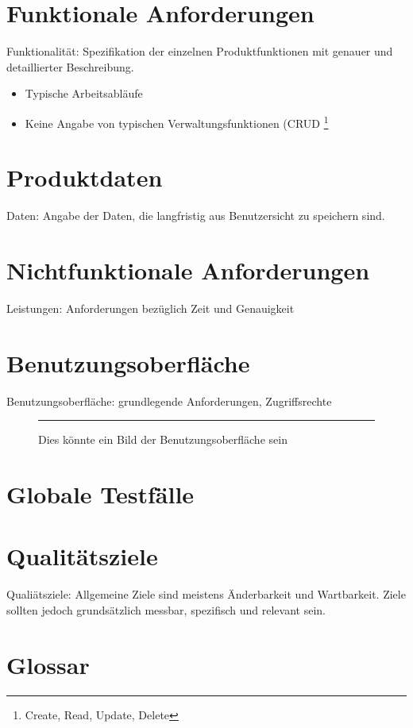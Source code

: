 \documentclass[a4paper]{scrreprt}
\begin{document}
    \chapter{Funktionale Anforderungen}
        Funktionalität: Spezifikation der einzelnen Produktfunktionen mit genauer und
        detaillierter Beschreibung.
 
        \begin{itemize}
            \item Typische Arbeitsabläufe
            \item Keine Angabe von typischen Verwaltungsfunktionen (CRUD \footnote{Create,
                  Read, Update, Delete}
        \end{itemize}
 
    \chapter{Produktdaten}
        Daten: Angabe der Daten, die langfristig aus Benutzersicht zu speichern sind.
 
    \chapter{Nichtfunktionale Anforderungen}
        Leistungen: Anforderungen bezüglich Zeit und Genauigkeit
 
    \chapter{Benutzungsoberfläche}
        Benutzungsoberfläche: grundlegende Anforderungen, Zugriffsrechte
 
        \begin{figure}[ht]
            \centering
            \rule{8cm}{6cm}
            \caption{Dies könnte ein Bild der Benutzungsoberfläche sein}
        \end{figure}

    \chapter{Globale Testfälle}
 
    \chapter{Qualitätsziele}
        Qualiätsziele: Allgemeine Ziele sind meistens Änderbarkeit und Wartbarkeit.
        Ziele sollten jedoch grundsätzlich messbar, spezifisch und relevant sein.
 
    \chapter{Glossar}
 
    \listoffigures
 
\end{document}

